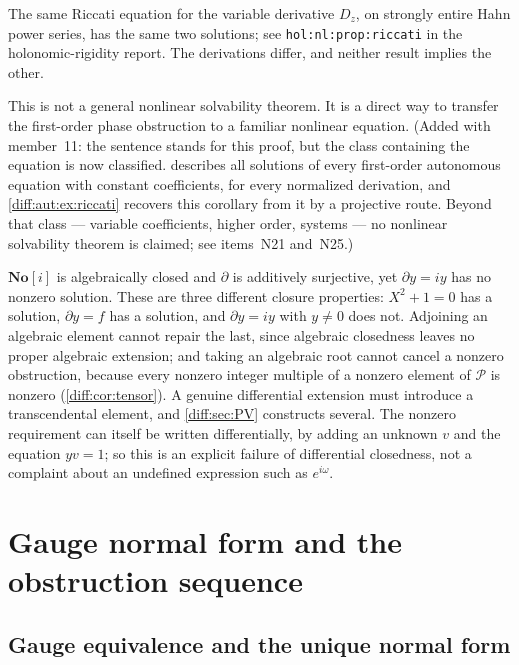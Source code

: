 \documentclass[11pt,letterpaper]{article}
\numberwithin{equation}{section}
\theoremstyle{definition}
\theoremstyle{remark}
\newcommand{\SC}{\mathbf{No}[i]}
\newcommand{\der}{\partial}
\newcommand{\Pcl}{\mathcal P}
\begin{document}
The same Riccati equation for the variable derivative $D_z$, on strongly
entire Hahn power series, has the same two solutions; see
\texttt{hol:nl:prop:riccati} in the holonomic-rigidity report. The
derivations differ, and neither result implies the other.

This is not a general nonlinear solvability theorem. It is a direct way to
transfer the first-order phase obstruction to a familiar nonlinear equation.
(Added with member~11: the sentence stands for this proof, but the class
containing the equation is now classified.  describes all
solutions of every first-order autonomous equation with constant coefficients,
for every normalized derivation, and \cref{diff:aut:ex:riccati} recovers this
corollary from it by a projective route. Beyond that class --- variable
coefficients, higher order, systems --- no nonlinear solvability theorem is
claimed; see items~N21 and~N25.)

\begin{remark}
\label{diff:rem:algnotdiff}
$\SC$ is algebraically closed and $\der$ is additively surjective, yet
$\der y=iy$ has no nonzero solution. These are three different closure
properties: $X^{2}+1=0$ has a solution, $\der y=f$ has a solution, and
$\der y=iy$ with $y\neq0$ does not. Adjoining an algebraic element cannot
repair the last, since algebraic closedness leaves no proper algebraic
extension; and taking an algebraic root cannot cancel a nonzero obstruction,
because every nonzero integer multiple of a nonzero element of $\Pcl$ is
nonzero (\cref{diff:cor:tensor}). A genuine differential extension must
introduce a transcendental element, and \cref{diff:sec:PV} constructs several.
The nonzero requirement can itself be written differentially, by adding an
unknown $v$ and the equation $yv=1$; so this is an explicit failure of
differential closedness, not a complaint about an undefined expression such as
$e^{i\omega}$.
\end{remark}

\section{Gauge normal form and the obstruction sequence}
\label{diff:sec:gauge}

\subsection{Gauge equivalence and the unique normal form}
\label{diff:sub:gaugeform}
\end{document}
